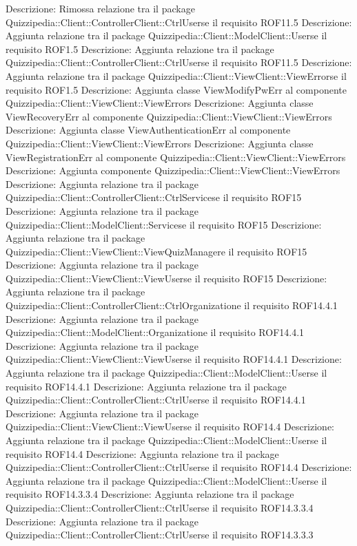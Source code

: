 Descrizione: Rimossa relazione tra il package Quizzipedia::Client::ControllerClient::CtrlUserse il requisito ROF11.5 
Descrizione: Aggiunta relazione tra il package Quizzipedia::Client::ModelClient::Userse il requisito ROF1.5 
Descrizione: Aggiunta relazione tra il package Quizzipedia::Client::ControllerClient::CtrlUserse il requisito ROF11.5 
Descrizione: Aggiunta relazione tra il package Quizzipedia::Client::ViewClient::ViewErrorse il requisito ROF1.5 
Descrizione: Aggiunta classe ViewModifyPwErr al componente Quizzipedia::Client::ViewClient::ViewErrors 
Descrizione: Aggiunta classe ViewRecoveryErr al componente Quizzipedia::Client::ViewClient::ViewErrors 
Descrizione: Aggiunta classe ViewAuthenticationErr al componente Quizzipedia::Client::ViewClient::ViewErrors 
Descrizione: Aggiunta classe ViewRegistrationErr al componente Quizzipedia::Client::ViewClient::ViewErrors 
Descrizione: Aggiunta componente Quizzipedia::Client::ViewClient::ViewErrors 
Descrizione: Aggiunta relazione tra il package Quizzipedia::Client::ControllerClient::CtrlServicese il requisito ROF15 
Descrizione: Aggiunta relazione tra il package Quizzipedia::Client::ModelClient::Servicese il requisito ROF15 
Descrizione: Aggiunta relazione tra il package Quizzipedia::Client::ViewClient::ViewQuizManagere il requisito ROF15 
Descrizione: Aggiunta relazione tra il package Quizzipedia::Client::ViewClient::ViewUserse il requisito ROF15 
Descrizione: Aggiunta relazione tra il package Quizzipedia::Client::ControllerClient::CtrlOrganizatione il requisito ROF14.4.1 
Descrizione: Aggiunta relazione tra il package Quizzipedia::Client::ModelClient::Organizatione il requisito ROF14.4.1 
Descrizione: Aggiunta relazione tra il package Quizzipedia::Client::ViewClient::ViewUserse il requisito ROF14.4.1 
Descrizione: Aggiunta relazione tra il package Quizzipedia::Client::ModelClient::Userse il requisito ROF14.4.1 
Descrizione: Aggiunta relazione tra il package Quizzipedia::Client::ControllerClient::CtrlUserse il requisito ROF14.4.1 
Descrizione: Aggiunta relazione tra il package Quizzipedia::Client::ViewClient::ViewUserse il requisito ROF14.4 
Descrizione: Aggiunta relazione tra il package Quizzipedia::Client::ModelClient::Userse il requisito ROF14.4 
Descrizione: Aggiunta relazione tra il package Quizzipedia::Client::ControllerClient::CtrlUserse il requisito ROF14.4 
Descrizione: Aggiunta relazione tra il package Quizzipedia::Client::ModelClient::Userse il requisito ROF14.3.3.4 
Descrizione: Aggiunta relazione tra il package Quizzipedia::Client::ControllerClient::CtrlUserse il requisito ROF14.3.3.4 
Descrizione: Aggiunta relazione tra il package Quizzipedia::Client::ControllerClient::CtrlUserse il requisito ROF14.3.3.3 
